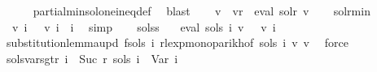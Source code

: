\begin{isabellebody}
\ \ \ \ \isamarkupfalse%
\ partial{\isacharunderscore}{\kern0pt}min{\isacharunderscore}{\kern0pt}sol{\isacharunderscore}{\kern0pt}one{\isacharunderscore}{\kern0pt}ineq{\isacharunderscore}{\kern0pt}def\ \isamarkupfalse%
\ blast\isanewline
\ \ \isamarkupfalse%
\ {\isacharquery}{\kern0pt}v{\isacharprime}{\kern0pt}\ {\isacharequal}{\kern0pt}\ {\isachardoublequoteopen}v{}{\isacharparenleft}{\kern0pt}r\ {\isacharcolon}{\kern0pt}{\isacharequal}{\kern0pt}\ eval\ sol{\isacharunderscore}{\kern0pt}r\ v{}{\isacharparenright}{\kern0pt}{\isachardoublequoteclose}\isanewline
\ \ \isamarkupfalse%
\ sol{\isacharunderscore}{\kern0pt}r{\isacharunderscore}{\kern0pt}min\ \isamarkupfalse%
\ {\isachardoublequoteopen}{\isasymPsi}\ {\isacharparenleft}{\kern0pt}{\isacharquery}{\kern0pt}v{\isacharprime}{\kern0pt}\ i{\isacharparenright}{\kern0pt}\ {\isasymsubseteq}\ {\isasymPsi}\ {\isacharparenleft}{\kern0pt}v{}\ i{\isacharparenright}{\kern0pt}{\isachardoublequoteclose}\ \ i\ \isamarkupfalse%
\ simp\isanewline
\ \ \isamarkupfalse%
\ sols{\isacharunderscore}{\kern0pt}s{}\ \isamarkupfalse%
\ {\isachardoublequoteopen}{\isasymPsi}\ {\isacharparenleft}{\kern0pt}eval\ {\isacharparenleft}{\kern0pt}sols{\isacharprime}{\kern0pt}\ i{\isacharparenright}{\kern0pt}\ v{}{\isacharparenright}{\kern0pt}\ {\isasymsubseteq}\ {\isasymPsi}\ {\isacharparenleft}{\kern0pt}v{}\ i{\isacharparenright}{\kern0pt}{\isachardoublequoteclose}\isanewline
\ \ \ \ \isamarkupfalse%
\ substitution{\isacharunderscore}{\kern0pt}lemma{\isacharunderscore}{\kern0pt}upd{\isacharbrackleft}{\kern0pt}\ f{\isacharequal}{\kern0pt}{\isachardoublequoteopen}sols\ i{\isachardoublequoteclose}{\isacharbrackright}{\kern0pt}\ rlexp{\isacharunderscore}{\kern0pt}mono{\isacharunderscore}{\kern0pt}parikh{\isacharbrackleft}{\kern0pt}of\ {\isachardoublequoteopen}sols\ i{\isachardoublequoteclose}\ {\isacharquery}{\kern0pt}v{\isacharprime}{\kern0pt}\ v{}{\isacharbrackright}{\kern0pt}\ \isamarkupfalse%
\ force\isanewline
{}\isamarkupfalse%
%
\endisatagproof
{\isafoldproof}%
%
\isadelimproof
\isanewline
%
\endisadelimproof
\isanewline
{}\isamarkupfalse%
\ sols{\isacharprime}{\kern0pt}{\isacharunderscore}{\kern0pt}vars{\isacharunderscore}{\kern0pt}gt{\isacharunderscore}{\kern0pt}r{\isacharcolon}{\kern0pt}\ {\isachardoublequoteopen}{\isasymforall}i\ {\isasymge}\ Suc\ r{\isachardot}{\kern0pt}\ sols{\isacharprime}{\kern0pt}\ i\ {\isacharequal}{\kern0pt}\ Var\ i{\isachardoublequoteclose}\isanewline

\end{isabellebody}
